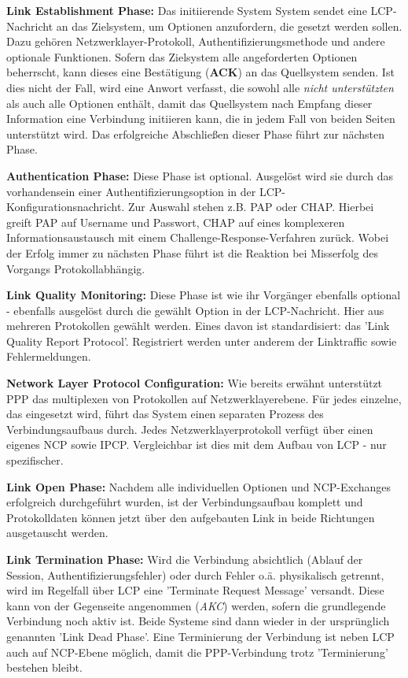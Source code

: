 \textbf{Link Establishment Phase:}
Das initiierende System System sendet eine \ac{LCP}-Nachricht an das Zielsystem,
um Optionen anzufordern, die gesetzt werden sollen. Dazu gehören
Netzwerklayer-Protokoll, Authentifizierungsmethode und andere optionale
Funktionen. Sofern das Zielsystem alle angeforderten Optionen beherrscht,
kann dieses eine Bestätigung (\textbf{ACK}) an das Quellsystem senden.
Ist dies nicht der Fall, wird eine Anwort verfasst, die sowohl alle
\textit{nicht unterstützten} als auch alle  Optionen
enthält, damit das Quellsystem nach Empfang dieser Information eine
Verbindung initiieren kann, die in jedem Fall von beiden Seiten unterstützt
wird. Das erfolgreiche Abschließen dieser Phase führt zur nächsten Phase.

\textbf{Authentication Phase:}
Diese Phase ist optional. Ausgelöst wird sie durch das vorhandensein einer
Authentifizierungsoption in der LCP-Konfigurationsnachricht.
Zur Auswahl stehen z.B. \ac{PAP} oder \ac{CHAP}.
Hierbei greift PAP auf Username und Passwort, CHAP auf eines komplexeren Informationsaustausch
mit einem Challenge-Response-Verfahren zurück. Wobei der Erfolg immer zu nächsten
Phase führt ist die Reaktion bei Misserfolg des Vorgangs Protokollabhängig.

\textbf{Link Quality Monitoring:}
Diese Phase ist wie ihr Vorgänger ebenfalls optional - ebenfalls ausgelöst durch
die gewählt Option in der LCP-Nachricht.
Hier aus mehreren Protokollen gewählt werden. Eines davon ist standardisiert:
das 'Link Quality Report Protocol'. Registriert werden unter anderem der Linktraffic
sowie Fehlermeldungen.

\textbf{Network Layer Protocol Configuration:}
Wie bereits erwähnt unterstützt PPP  das multiplexen von Protokollen auf
Netzwerklayerebene. Für jedes einzelne, das eingesetzt wird,
führt das System einen separaten Prozess des Verbindungsaufbaus durch.
Jedes Netzwerklayerprotokoll verfügt über einen eigenes \ac{NCP} sowie \ac{IPCP}.
Vergleichbar ist dies mit dem Aufbau von \ac{LCP} - nur spezifischer.

\textbf{Link Open Phase:}
Nachdem alle individuellen Optionen und NCP-Exchanges erfolgreich durchgeführt wurden,
ist der Verbindungsaufbau komplett und Protokolldaten können jetzt über den aufgebauten
Link in beide Richtungen ausgetauscht werden.

\textbf{Link Termination Phase:}
Wird die Verbindung absichtlich (Ablauf der Session, Authentifizierungsfehler)
oder durch Fehler o.ä. physikalisch getrennt, wird im Regelfall über \ac{LCP}
eine 'Terminate Request Message' versandt. Diese kann von der Gegenseite
angenommen (\textit{AKC}) werden, sofern die grundlegende Verbindung noch aktiv ist.
Beide Systeme sind dann wieder in der ursprünglich genannten 'Link Dead Phase'.
Eine Terminierung der Verbindung ist neben \ac{LCP} auch auf \ac{NCP}-Ebene möglich,
damit die PPP-Verbindung trotz 'Terminierung' bestehen bleibt.



